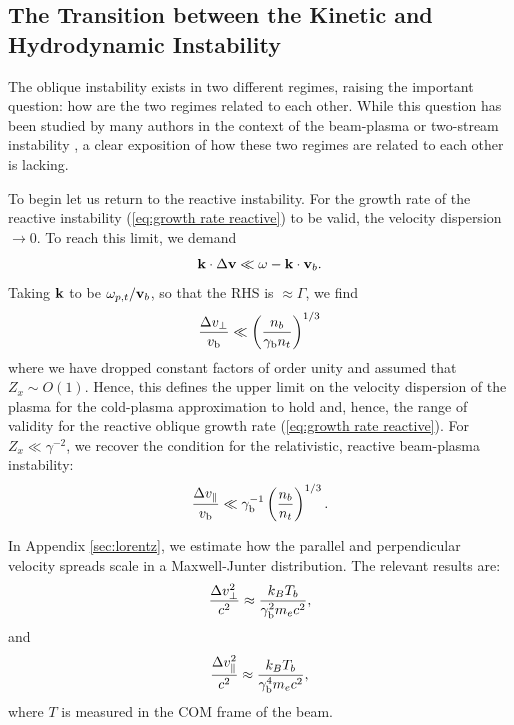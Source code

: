\documentclass[usenatbib,iop,apj,numberedappendix]{aeb_emulateapj_2015}
\newcommand\bmath[1] {\mbox{\boldmath$\rm #1$}}
\newcommand{\vel}{\ensuremath{\bmath{v}}}
\newcommand{\kvec}{\ensuremath{\bmath{k}}}
\newcommand{\gammabeam}{\ensuremath{\gamma_{\rm b}}}
\newcommand{\vbeam}{\ensuremath{v_{\rm b}}}
\begin{document}
\subsection{The Transition between the Kinetic and Hydrodynamic Instability}\label{sec:transition}

The oblique instability exists in two different regimes, raising the important question: how are the two regimes related to each other. While this question has been studied by many authors in the context of the beam-plasma or two-stream instability \citep[see for instance][]{Melrose86,Boyd},  a clear exposition of how these two regimes are related to each other is lacking.  

To begin let us return to the reactive instability.  For the growth rate of the reactive instability (\ref{eq:growth rate reactive}) to be valid, the velocity dispersion $\rightarrow 0$.   To reach this limit, we demand
\begin{equation}
 \kvec\cdot\Delta \vel \ll \omega - \kvec\cdot\vel_b.
\end{equation}
Taking $\kvec$ to be $\omega_{p,t}/\vel_b$, so that the RHS is $\approx \Gamma$, we find
\begin{equation}\label{eq:oblique reactive regime}
 \frac{\Delta v_{\perp}}{\vbeam} \ll \left(\frac{n_b}{\gammabeam n_t}\right)^{1/3}
\end{equation}
where we have dropped constant factors of order unity and assumed that $Z_x \sim O(1)$.  Hence, this defines the upper limit on the velocity dispersion of the plasma for the cold-plasma approximation to hold and, hence, the range of validity for the reactive oblique growth rate (\ref{eq:growth rate reactive}).  For $Z_x \ll \gamma^{-2}$, we recover the condition for the relativistic, reactive beam-plasma instability:
\begin{equation}\label{eq:bp reactive regime}
\frac{\Delta v_{\parallel}}{\vbeam} \ll \gammabeam^{-1}\left(\frac{n_b}{n_t}\right)^{1/3}.
\end{equation}

In Appendix \ref{sec:lorentz}, we estimate how the parallel and perpendicular velocity spreads scale in a Maxwell-Junter distribution.  The relevant results are: 
\begin{equation}
\frac{\Delta v_{\perp}^2}{c^2} \approx \frac {k_B T_b}{\gammabeam^2 m_e c^2 },
\end{equation}
and 
\begin{equation}
\frac{\Delta v_{\parallel}^2}{c^2} \approx \frac {k_B T_b}{\gammabeam^4 m_e c^2 },
\end{equation}
where $T$ is measured in the COM frame of the beam.  
\end{document}
